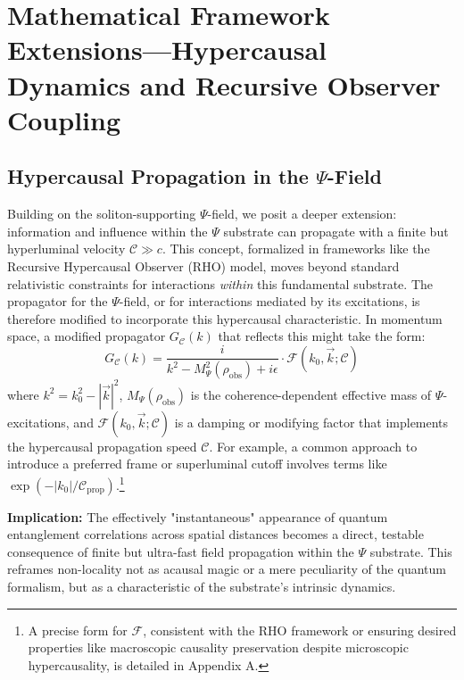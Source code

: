 \documentclass[11pt, a4paper]{book}
\begin{document}
\section{Mathematical Framework Extensions—Hypercausal Dynamics and Recursive Observer Coupling}
\label{sec:mathframeworkext}

\subsection{Hypercausal Propagation in the $\Psi$-Field}
\label{ssec:mathframeworkext_hypercausal}
Building on the soliton-supporting $\Psi$-field, we posit a deeper extension: information and influence within the $\Psi$ substrate can propagate with a finite but hyperluminal velocity $\mathcal{C} \gg c$. This concept, formalized in frameworks like the Recursive Hypercausal Observer (RHO) model, moves beyond standard relativistic constraints for interactions \emph{within} this fundamental substrate. The propagator for the $\Psi$-field, or for interactions mediated by its excitations, is therefore modified to incorporate this hypercausal characteristic. In momentum space, a modified propagator $G_\mathcal{C}(k)$ that reflects this might take the form:
\[ G_\mathcal{C}(k) = \frac{i}{k^2 - M_\Psi^2(\rho_{\text{obs}}) + i\epsilon} \cdot \mathcal{F}(k_0, \vec{k}; \mathcal{C}) \]
where $k^2 = k_0^2 - |\vec{k}|^2$, $M_\Psi(\rho_{\text{obs}})$ is the coherence-dependent effective mass of $\Psi$-excitations, and $\mathcal{F}(k_0, \vec{k}; \mathcal{C})$ is a damping or modifying factor that implements the hypercausal propagation speed $\mathcal{C}$. For example, a common approach to introduce a preferred frame or superluminal cutoff involves terms like $\exp(-|k_0|/\mathcal{C}_{\text{prop}})$.\footnote{A precise form for $\mathcal{F}$, consistent with the RHO framework or ensuring desired properties like macroscopic causality preservation despite microscopic hypercausality, is detailed in Appendix A.}

\textbf{Implication:} The effectively "instantaneous" appearance of quantum entanglement correlations across spatial distances becomes a direct, testable consequence of finite but ultra-fast field propagation within the $\Psi$ substrate. This reframes non-locality not as acausal magic or a mere peculiarity of the quantum formalism, but as a characteristic of the substrate's intrinsic dynamics.
\end{document}
